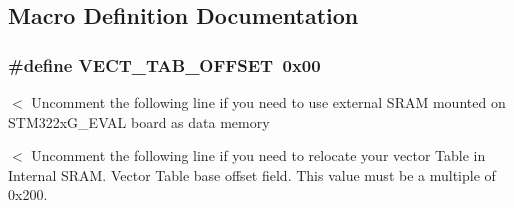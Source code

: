 \subsection{Macro Definition Documentation}
\hypertarget{group___s_t_m32_f2xx___system___private___defines_ga40e1495541cbb4acbe3f1819bd87a9fe}{
\subsubsection[{V\-E\-C\-T\-\_\-\-T\-A\-B\-\_\-\-O\-F\-F\-S\-E\-T}]{\setlength{\rightskip}{0pt plus 5cm}\#define V\-E\-C\-T\-\_\-\-T\-A\-B\-\_\-\-O\-F\-F\-S\-E\-T~0x00}}\label{group___s_t_m32_f2xx___system___private___defines_ga40e1495541cbb4acbe3f1819bd87a9fe}
$<$ Uncomment the following line if you need to use external S\-R\-A\-M mounted on S\-T\-M322x\-G\-\_\-\-E\-V\-A\-L board as data memory

$<$ Uncomment the following line if you need to relocate your vector Table in Internal S\-R\-A\-M. Vector Table base offset field. This value must be a multiple of 0x200. 